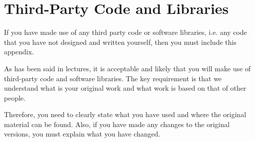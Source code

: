 \chapter{Third-Party Code and Libraries}

If you have made use of any third party code or software libraries, i.e. any code that you have not designed and written yourself, then you must include this appendix. 

As has been said in lectures, it is acceptable and likely that you will make use of third-party code and software libraries. The key requirement is that we understand what is your original work and what work is based on that of other people. 

Therefore, you need to clearly state what you have used and where the original material can be found. Also, if you have made any changes to the original versions, you must explain what you have changed. 
